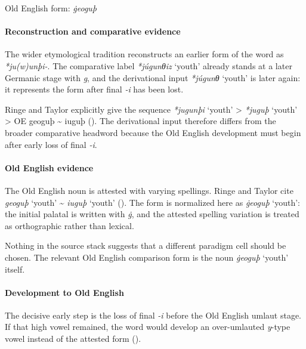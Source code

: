 \documentclass[
  british,
  a4paper,
]{article}
\providecommand{\Recon}[1]{\emph{*#1}}
\begin{document}
Old English form: \emph{ġeoguþ}

\paragraph{Reconstruction and comparative
evidence}\label{reconstruction-and-comparative-evidence-116}

The wider etymological tradition reconstructs an earlier form of the
word as {\emph{*ju(w)unþi-}}. The comparative label \Recon{júgunθiz}
`youth' already stands at a later Germanic stage with \emph{g}, and the
derivational input \Recon{júgunθ} `youth' is later again: it represents
the form after final \emph{-i} has been lost.

Ringe and Taylor explicitly give the sequence \Recon{jugunþi} `youth'
\textgreater{} \Recon{juguþ} `youth' \textgreater{} OE geoguþ
\textasciitilde{} iuguþ (). The derivational input therefore differs from the broader
comparative headword because the Old English development must begin
after early loss of final \emph{-i}.

\paragraph{Old English evidence}\label{old-english-evidence-116}

The Old English noun is attested with varying spellings. Ringe and
Taylor cite {\emph{geoguþ}} `youth' \textasciitilde{} {\emph{iuguþ}}
`youth' ().
The form is normalized here as {\emph{ġeoguþ}} `youth': the initial
palatal is written with \emph{ġ}, and the attested spelling variation is
treated as orthographic rather than lexical.

Nothing in the source stack suggests that a different paradigm cell
should be chosen. The relevant Old English comparison form is the noun
{\emph{ġeoguþ}} `youth' itself.

\paragraph{Development to Old
English}\label{development-to-old-english-116}

The decisive early step is the loss of final \emph{-i} before the Old
English umlaut stage. If that high vowel remained, the word would
develop an over-umlauted \emph{y}-type vowel instead of the attested
form ().
\end{document}

